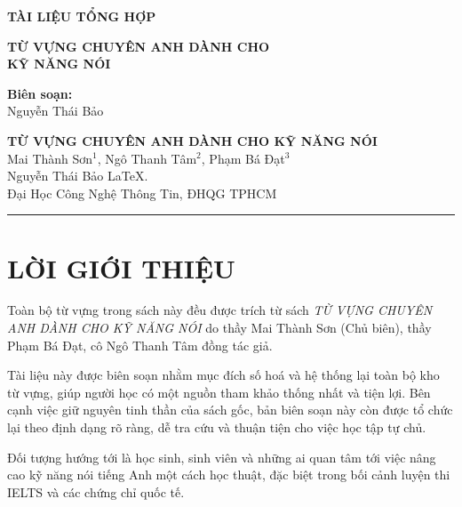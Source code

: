 \documentclass[a4paper,12pt]{article}
\begin{document}
\begin{titlepage}
\begin{center}
\textbf{\LARGE TÀI LIỆU TỔNG HỢP}\\[0.5cm] \vspace{20pt}

\vfill

\textbf{\LARGE  TỪ VỰNG CHUYÊN ANH DÀNH CHO\\ KỸ NĂNG NÓI}\\

\vfill

\textbf {\large Biên soạn:}\\[0.2cm]
\Large {Nguyễn Thái Bảo}\\[0.1cm]
\end{center}

\end{titlepage}

\begin{center}
    \large \textbf{TỪ VỰNG CHUYÊN ANH DÀNH CHO KỸ NĂNG NÓI}\\
    \vspace{2mm}
    Mai Thành Sơn$^{1}$, Ngô Thanh Tâm$^{2}$, Phạm Bá Đạt$^{3}$\\
    \vspace{7.5mm}
    Nguyễn Thái Bảo \LaTeX.\\ Đại Học Công Nghệ Thông Tin, ĐHQG TPHCM  

        \begin{center}
		    \textcolor{azul}{\rule{170mm}{0.5mm}}
	    \end{center}	
\end{center}

\section*{LỜI GIỚI THIỆU}
\noindent
Toàn bộ từ vựng trong sách này đều được trích từ sách \emph{TỪ VỰNG CHUYÊN ANH DÀNH CHO KỸ NĂNG NÓI} do thầy Mai Thành Sơn (Chủ biên), thầy Phạm Bá Đạt, cô Ngô Thanh Tâm đồng tác giả.

\vspace{3mm}
\noindent
Tài liệu này được biên soạn nhằm mục đích số hoá và hệ thống lại toàn bộ kho từ vựng,
giúp người học có một nguồn tham khảo thống nhất và tiện lợi. 
Bên cạnh việc giữ nguyên tinh thần của sách gốc, bản biên soạn này còn được 
tổ chức lại theo định dạng rõ ràng, dễ tra cứu và thuận tiện cho việc học tập tự chủ.


\vspace{3mm}
\noindent
Đối tượng hướng tới là học sinh, sinh viên và những ai quan tâm tới việc 
nâng cao kỹ năng nói tiếng Anh một cách học thuật, đặc biệt trong bối cảnh 
luyện thi IELTS và các chứng chỉ quốc tế. 
\end{document}
